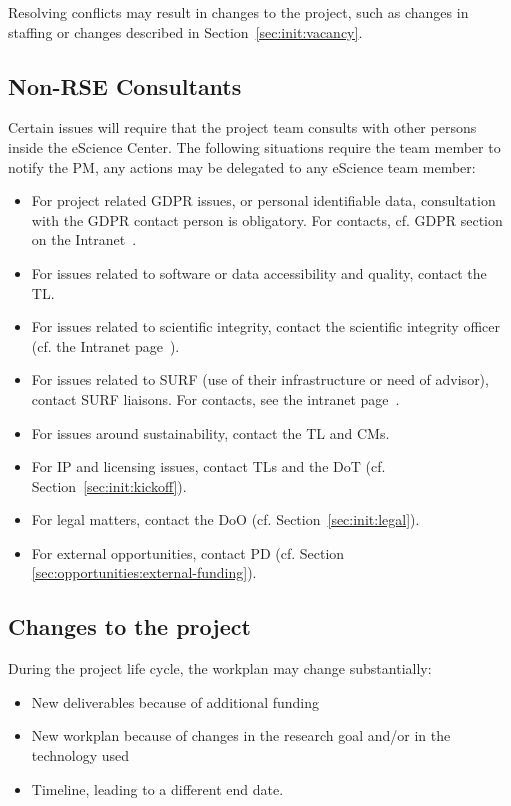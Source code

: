 Resolving conflicts may result in changes to the project, such as changes in staffing or changes described in Section~\ref{sec:init:vacancy}.

\subsection{Non-RSE Consultants}
\label{sec:exec:consult}
Certain issues will require that the project team consults with other persons inside the eScience Center. The following
situations require the team member to notify the PM, any actions may be delegated to any eScience team member:

\begin{itemize}
\item For project related GDPR issues, or personal identifiable data, consultation with the GDPR contact person is
obligatory. For contacts, cf. GDPR section on the Intranet~\cite{intranet}. 
\item For issues related to software or data accessibility and quality, contact the TL.
\item For issues related to scientific integrity, contact the scientific integrity officer (cf. the Intranet page~\cite{intranet}).
\item For issues related to SURF (use of their infrastructure or need of advisor), contact SURF liaisons. For
contacts, see the intranet page~\cite{intranet}.
\item For issues around sustainability, contact the TL and CMs.
\item For IP and licensing issues, contact TLs and the DoT (cf. Section~\ref{sec:init:kickoff}).
\item For legal matters, contact the DoO (cf. Section~\ref{sec:init:legal}).
\item For external opportunities, contact PD (cf. Section \ref{sec:opportunities:external-funding}).
\end{itemize}

\subsection{Changes to the project}
\label{sec:exec:changes}
During the project life cycle, the workplan may change substantially:

\begin{itemize}
\item New deliverables because of additional funding
\item New workplan because of changes in the research goal and/or in the technology used
\item Timeline, leading to a different end date.
\end{itemize}

